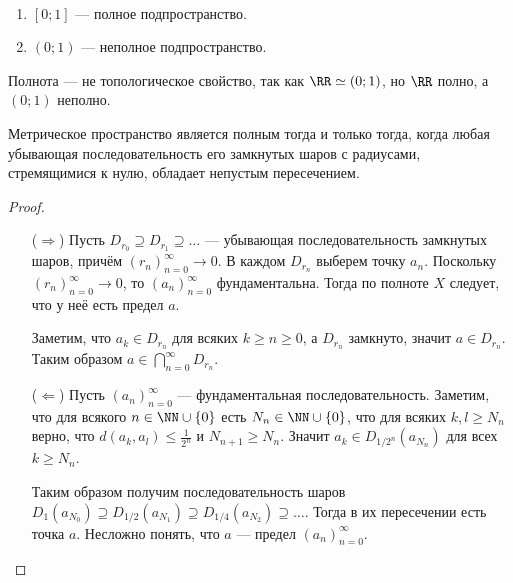 \documentclass[12pt,a4paper]{article}
\begin{document}
    \begin{example}\ 
        \begin{enumerate}
            \item $[0;1]$ --- полное подпространство.
            \item $(0;1)$ --- неполное подпространство.
        \end{enumerate}
    \end{example}

    \begin{corollary}
        Полнота --- не топологическое свойство, так как $\RR \simeq (0; 1)$, но $\RR$ полно, а $(0; 1)$ неполно.
    \end{corollary}

    \begin{theorem}
        Метрическое пространство является полным тогда и только тогда, когда любая убывающая последовательность его замкнутых шаров с радиусами, стремящимися к нулю, обладает непустым пересечением.
    \end{theorem}

    \begin{proof}\ 
        \begin{itemize}
            \item[($\Rightarrow$)] Пусть $D_{r_0} \supseteq D_{r_1} \supseteq \dots$ --- убывающая последовательность замкнутых шаров, причём $(r_n)_{n=0}^\infty \to 0$. В каждом $D_{r_n}$ выберем точку $a_n$. Поскольку $(r_n)_{n=0}^\infty \to 0$, то $(a_n)_{n=0}^\infty$ фундаментальна. Тогда по полноте $X$ следует, что у неё есть предел $a$.
            
            Заметим, что $a_k \in D_{r_n}$ для всяких $k \geqslant n \geqslant 0$, а $D_{r_n}$ замкнуто, значит $a \in D_{r_n}$. Таким образом $a \in \bigcap_{n=0}^\infty D_{r_n}$.

            \item[($\Leftarrow$)] Пусть $(a_n)_{n=0}^\infty$ --- фундаментальная последовательность. Заметим, что для всякого $n \in \NN \cup \{0\}$ есть $N_n \in \NN \cup \{0\}$, что для всяких $k, l \geqslant N_n$ верно, что $d(a_k, a_l) \leqslant \frac{1}{2^n}$ и $N_{n+1} \geqslant N_n$. Значит $a_k \in D_{1/2^n}(a_{N_n})$ для всех $k \geqslant N_n$.
            
            Таким образом получим последовательность шаров $D_{1}(a_{N_0}) \supseteq D_{1/2}(a_{N_1}) \supseteq D_{1/4}(a_{N_2}) \supseteq \dots$. Тогда в их пересечении есть точка $a$. Несложно понять, что $a$ --- предел $(a_n)_{n=0}^\infty$.
        \end{itemize}
    \end{proof}
\end{document}
